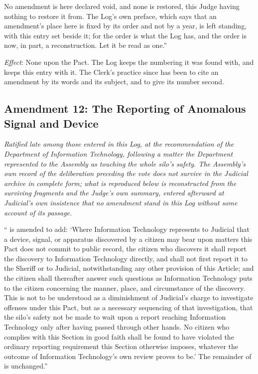 No amendment is here declared void, and none is restored, this Judge having nothing to restore it from. The Log's own preface, which says that an amendment's place here is fixed by its order and not by a year, is left standing, with this entry set beside it; for the order is what the Log has, and the order is now, in part, a reconstruction. Let it be read as one.''

\textit{Effect}: None upon the Pact. The Log keeps the numbering it was found with, and keeps this entry with it. The Clerk's practice since has been to cite an amendment by its words and its subject, and to give its number second.

\subsection*{Amendment 12: The Reporting of Anomalous Signal and Device}

\textit{Ratified late among those entered in this Log, at the recommendation of the Department of Information Technology, following a matter the Department represented to the Assembly as touching the whole silo's safety. The Assembly's own record of the deliberation preceding the vote does not survive in the Judicial archive in complete form; what is reproduced below is reconstructed from the surviving fragments and the Judge's own summary, entered afterward at Judicial's own insistence that no amendment stand in this Log without some account of its passage.}

`` is amended to add: `Where Information Technology represents to Judicial that a device, signal, or apparatus discovered by a citizen may bear upon matters this Pact does not commit to public record, the citizen who discovers it shall report the discovery to Information Technology directly, and shall not first report it to the Sheriff or to Judicial, notwithstanding any other provision of this Article; and the citizen shall thereafter answer such questions as Information Technology puts to the citizen concerning the manner, place, and circumstance of the discovery. This is not to be understood as a diminishment of Judicial's charge to investigate offenses under this Pact, but as a necessary sequencing of that investigation, that the silo's safety not be made to wait upon a report reaching Information Technology only after having passed through other hands. No citizen who complies with this Section in good faith shall be found to have violated the ordinary reporting requirement this Section otherwise imposes, whatever the outcome of Information Technology's own review proves to be.' The remainder of  is unchanged.''

